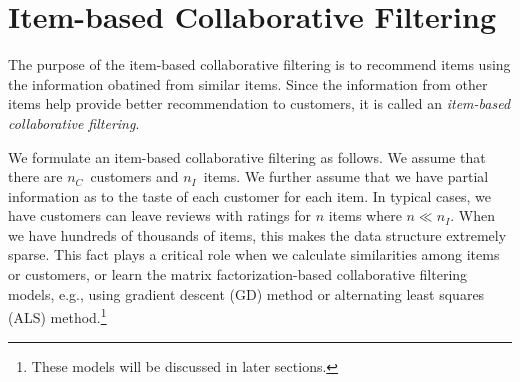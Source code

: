 \newcommand{\numcus}{\ensuremath{{n_C}}}
\newcommand{\numitem}{\ensuremath{{n_I}}}
\newcommand{\numfeat}{\ensuremath{{n_F}}}
\newcommand{\numrating}{\ensuremath{{n_R}}}
\newcommand{\nan}{\ensuremath{\mathrm{NaN}}}
\newcommand{\ratmat}{\ensuremath{R}}
\newcommand{\ratvec}{r}
\newcommand{\ratmataggr}{\ensuremath{\bar{\ratmat}}}
\newcommand{\ratmatnorm}{\ensuremath{\tilde{\ratmat}}}
\newcommand{\ratmatpred}{\hat{\ratmat}}
\newcommand{\datsourceset}{\ensuremath{\mathcal{S}}}
\newcommand{\dir}{\mathrm{Dir}}
\newcommand{\simil}{s}
\newcommand{\bmscore}{\mathrm{bm}_{25}}
\newcommand{\avgcl}{\ensuremath{\bar{c}}}

\newcommand{\numfactors}{\ensuremath{{n_L}}}
\newcommand{\lfcn}{\ensuremath{l}}
\newcommand{\confvar}{c}
\newcommand{\confmat}{C}
\newcommand{\binvar}{p}
\newcommand{\binmat}{P}

\newcommand{\Xsvd}{\XYsvd{X}}
\newcommand{\Ysvd}{\XYsvd{Y}}
\newcommand{\XYsvd}[1]{{#1}_\mathrm{svd}}

\newcommand{\XY}[2]{{{#1}_{#2}}}
\newcommand{\XX}[1]{\XY{X}{#1}}
\newcommand{\YY}[1]{\XY{Y}{#1}}

\newcommand{\initX}{\tilde{X}}
\newcommand{\initY}{\tilde{Y}}

\newcommand{\Xsim}{\ensuremath{X^\mathrm{sim}}}
\newcommand{\Ysim}{\ensuremath{Y^\mathrm{sim}}}

\newcommand{\popest}{{\hat{\theta}}}
\newcommand{\popestk}[1]{\ensuremath{\popest_{#1}}}


\newpage

\section{Item-based Collaborative Filtering}

The purpose of the item-based collaborative filtering is to recommend items using the information obatined from similar items.
Since the information from other items help provide better recommendation to customers,
it is called an \emph{item-based collaborative filtering}.

We formulate an item-based collaborative filtering as follows.
We assume that there are \numcus\ customers and \numitem\ items.
We further assume that we have partial information as to the taste of each customer for each item.
In typical cases,
we have customers can leave reviews with ratings for $n$ items where $n \ll \numitem$.
When we have hundreds of thousands of items, this makes the data structure extremely sparse.
This fact plays a critical role when we calculate similarities among items or customers,
or learn the matrix factorization-based collaborative filtering models,
e.g., using gradient descent (GD) method or alternating least squares (ALS) method.\footnote{
    These models will be discussed in later sections.
}

